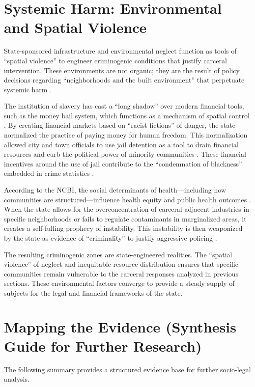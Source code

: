 \documentclass[12pt,openany]{book}
\begin{document}
\section{Systemic Harm: Environmental and Spatial Violence}

State-sponsored infrastructure and environmental neglect function as tools of ``spatial violence'' to engineer criminogenic conditions that justify carceral intervention. These environments are not organic; they are the result of policy decisions regarding ``neighborhoods and the built environment'' that perpetuate systemic harm \cite{ncbi_bookshelf}.

The institution of slavery has cast a ``long shadow'' over modern financial tools, such as the money bail system, which functions as a mechanism of spatial control \cite{vera}. By creating financial markets based on ``racist fictions'' of danger, the state normalized the practice of paying money for human freedom. This normalization allowed city and town officials to use jail detention as a tool to drain financial resources and curb the political power of minority communities \cite{vera}. These financial incentives around the use of jail contribute to the ``condemnation of blackness'' embedded in crime statistics \cite{vera}.

According to the NCBI, the social determinants of health---including how communities are structured---influence health equity and public health outcomes \cite{ncbi_bookshelf}. When the state allows for the overconcentration of carceral-adjacent industries in specific neighborhoods or fails to regulate contaminants in marginalized areas, it creates a self-fulling prophecy of instability. This instability is then weaponized by the state as evidence of ``criminality'' to justify aggressive policing \cite{ncbi_bookshelf}.

The resulting criminogenic zones are state-engineered realities. The ``spatial violence'' of neglect and inequitable resource distribution ensures that specific communities remain vulnerable to the carceral responses analyzed in previous sections. These environmental factors converge to provide a steady supply of subjects for the legal and financial frameworks of the state.

\section{Mapping the Evidence (Synthesis Guide for Further Research)}

The following summary provides a structured evidence base for further socio-legal analysis.
\end{document}
